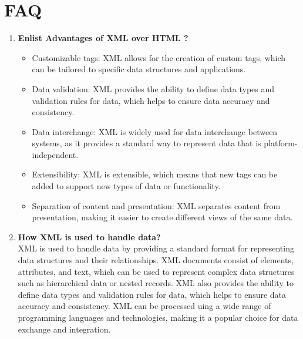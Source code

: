 \documentclass[11pt]{article}
\begin{document}
\section{FAQ}
\begin{enumerate}

    \item \textbf{Enlist Advantages of XML over HTML ?}\\
          \begin{itemize}
              \item Customizable tags: XML allows for the creation of custom tags, which can be tailored to specific data structures and applications.
              \item Data validation: XML provides the ability to define data types and validation rules for data, which helps to ensure data accuracy and consistency.
              \item Data interchange: XML is widely used for data interchange between systems, as it provides a standard way to represent data that is platform-independent.
              \item Extensibility: XML is extensible, which means that new tags can be added to support new types of data or functionality.
              \item Separation of content and presentation: XML separates content from presentation, making it easier to create different views of the same data.
          \end{itemize}

    \item \textbf{How XML is used to handle data?}\\
    
          XML is used to handle data by providing a standard format for representing data structures and their relationships. XML documents consist of elements, attributes, and text, which can be used to represent complex data structures such as hierarchical data or nested records. XML also provides the ability to define data types and validation rules for data, which helps to ensure data accuracy and consistency. XML can be processed uing a wide range of programming languages and technologies, making it a popular choice for data exchange and integration.


\end{enumerate}
\end{document}
